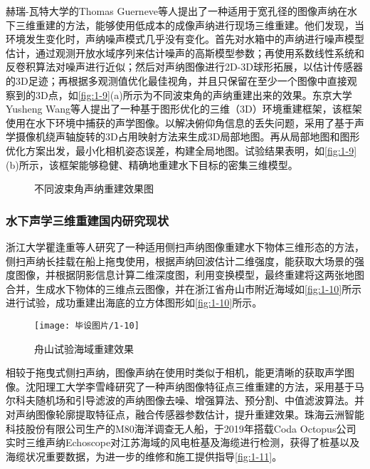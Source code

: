 赫瑞-瓦特大学的Thomas Guerneve等人提出了一种适用于宽孔径的图像声纳在水下三维重建的方法，能够使用低成本的成像声纳进行现场三维重建。他们发现，当环境发生变化时，声纳噪声模式几乎没有变化。首先对水箱中的声纳进行噪声模型估计，通过观测开放水域序列来估计噪声的高斯模型参数；再使用系数线性系统和反卷积算法对噪声进行近似；然后对声纳图像进行2D-3D球形拓展，以估计传感器的3D足迹；再根据多观测值优化最佳视角，并且只保留在至少一个图像中直接观察到的3D点，如\autoref{fig:1-9}(a)所示为不同波束角的声纳重建出来的效果\cite{GUERNEVE}。东京大学Yusheng Wang等人提出了一种基于图形优化的三维（3D）环境重建框架，该框架使用在水下环境中捕获的声学图像。以解决俯仰角信息的丢失问题，采用了基于声学摄像机绕声轴旋转的3D占用映射方法来生成3D局部地图。再从局部地图和图形优化方案出发，最小化相机姿态误差，构建全局地图。试验结果表明，如\autoref{fig:1-9}(b)所示，该框架能够稳健、精确地重建水下目标的密集三维模型\cite{Yusheng}。

\begin{figure}[htpb]
	\centering %
	\caption{不同波束角声纳重建效果图}
	\label{fig:1-9}
\end{figure}

\subsubsection{水下声学三维重建国内研究现状}

浙江大学瞿逢重等人研究了一种适用侧扫声纳图像重建水下物体三维形态的方法，侧扫声纳长挂载在船上拖曳使用，根据声纳回波估计二维强度，能获取大场景的强度图像，并根据阴影信息计算二维深度图，利用变换模型，最终重建将这两张地图合并，生成水下物体的三维点云图像，并在浙江省舟山市附近海域如\autoref{fig:1-10}所示进行试验，成功重建出海底的立方体图形如\autoref{fig:1-10}所示\cite{Jieying}。

\begin{figure}[htbp]
    \centering
    \texttt{[image: 毕设图片/1-10]}
    \caption{\label{fig:1-10}舟山试验海域重建效果\cite{Jieying}}
\end{figure}

相较于拖曳式侧扫声纳，图像声纳在使用时类似于相机，能更清晰的获取声学图像。沈阳理工大学李雪峰研究了一种声纳图像特征点三维重建的方法，采用基于马尔科夫随机场和引导滤波的声纳图像去噪、增强算法、预分割、中值滤波算法。并对声纳图像轮廓提取特征点，融合传感器参数估计，提升重建效果\cite{李雪峰}。珠海云洲智能科技股份有限公司生产的M80海洋调查无人船，于2019年搭载Coda Octopus公司实时三维声纳Echoscope对江苏海域的风电桩基及海缆进行检测，获得了桩基以及海缆状况重要数据，为进一步的维修和施工提供指导\autoref{fig:1-11}\cite{国船}。

